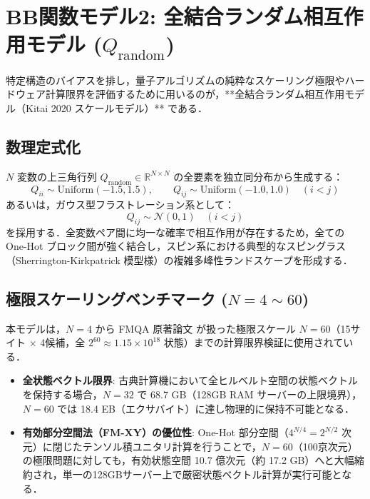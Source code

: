 \documentclass[11pt,a4paper]{ltjsarticle}
\begin{document}
\section{BB関数モデル2: 全結合ランダム相互作用モデル (\texorpdfstring{$Q_{\mathrm{random}}$}{Q\_random})}
\label{sec:model_random}
特定構造のバイアスを排し，量子アルゴリズムの純粋なスケーリング極限やハードウェア計算限界を評価するために用いるのが，**全結合ランダム相互作用モデル（Kitai 2020 スケールモデル）** である．

\subsection{数理定式化}
$N$ 変数の上三角行列 $Q_{\mathrm{random}} \in \mathbb{R}^{N \times N}$ の全要素を独立同分布から生成する：
\begin{equation}
Q_{ii} \sim \mathrm{Uniform}(-1.5, 1.5), \qquad Q_{ij} \sim \mathrm{Uniform}(-1.0, 1.0) \quad (i < j)
\end{equation}
あるいは，ガウス型フラストレーション系として：
\begin{equation}
Q_{ij} \sim \mathcal{N}(0, 1) \quad (i < j)
\end{equation}
を採用する．全変数ペア間に均一な確率で相互作用が存在するため，全ての One-Hot ブロック間が強く結合し，スピン系における典型的なスピングラス（Sherrington-Kirkpatrick 模型様）の複雑多峰性ランドスケープを形成する．

\subsection{極限スケーリングベンチマーク (\texorpdfstring{$N=4 \sim 60$}{N=4 to 60})}
本モデルは，$N=4$ から FMQA 原著論文 \cite{kitai2020} が扱った極限スケール $N=60$（15サイト $\times$ 4候補，全 $2^{60} \approx 1.15 \times 10^{18}$ 状態）までの計算限界検証に使用されている．
\begin{itemize}\setlength{\itemsep}{2pt}
    \item \textbf{全状態ベクトル限界}: 古典計算機において全ヒルベルト空間の状態ベクトルを保持する場合，$N=32$ で 68.7 GB（128GB RAM サーバーの上限境界），$N=60$ では 18.4 EB（エクサバイト）に達し物理的に保持不可能となる．
    \item \textbf{有効部分空間法（FM-XY）の優位性}: One-Hot 部分空間（$4^{N/4} = 2^{N/2}$ 次元）に閉じたテンソル積ユニタリ計算を行うことで，$N=60$（100京次元）の極限問題に対しても，有効状態空間 10.7 億次元（約 17.2 GB）へと大幅縮約され，単一の128GBサーバー上で厳密状態ベクトル計算が実行可能となる．
\end{itemize}
\end{document}
